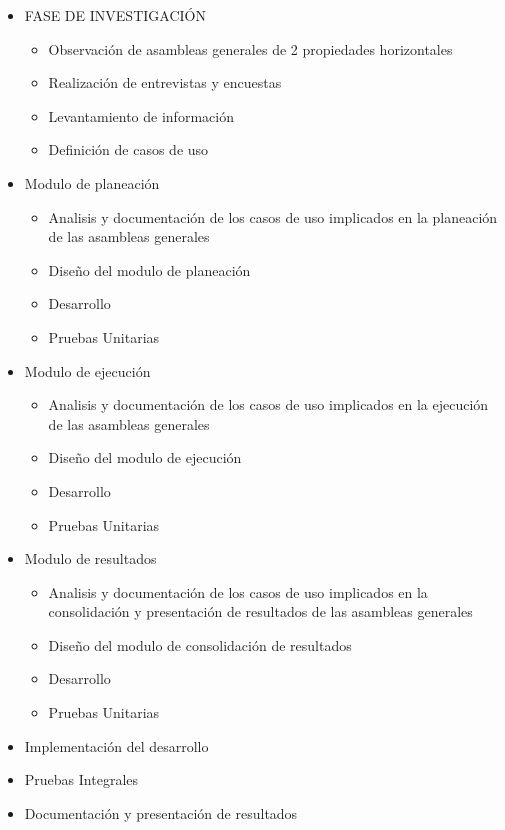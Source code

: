 \begin{itemize}
	\item FASE DE INVESTIGACIÓN
	\begin{itemize}
		\item Observación de asambleas generales de 2 propiedades horizontales
		\item Realización de entrevistas y encuestas
		\item Levantamiento de información
		\item Definición de casos de uso
	\end{itemize}
	
	\item Modulo de planeación
	\begin{itemize}
		\item Analisis y documentación de los casos de uso implicados en la planeación de las asambleas generales
		\item Diseño del modulo de planeación
		\item Desarrollo
		\item Pruebas Unitarias
	\end{itemize}
	
	\item Modulo de ejecución
	\begin{itemize}
		\item Analisis y documentación de los casos de uso implicados en la ejecución de las asambleas generales
		\item Diseño del modulo de ejecución
		\item Desarrollo
		\item Pruebas Unitarias
	\end{itemize}
	
	\item Modulo de resultados
	\begin{itemize}
		\item Analisis y documentación de los casos de uso implicados en la consolidación y presentación de resultados de las asambleas generales
		\item Diseño del modulo de consolidación de resultados
		\item Desarrollo
		\item Pruebas Unitarias
	\end{itemize}	

	\item Implementación del desarrollo
	\item Pruebas Integrales
	\item Documentación y presentación de resultados
	
\end{itemize}

